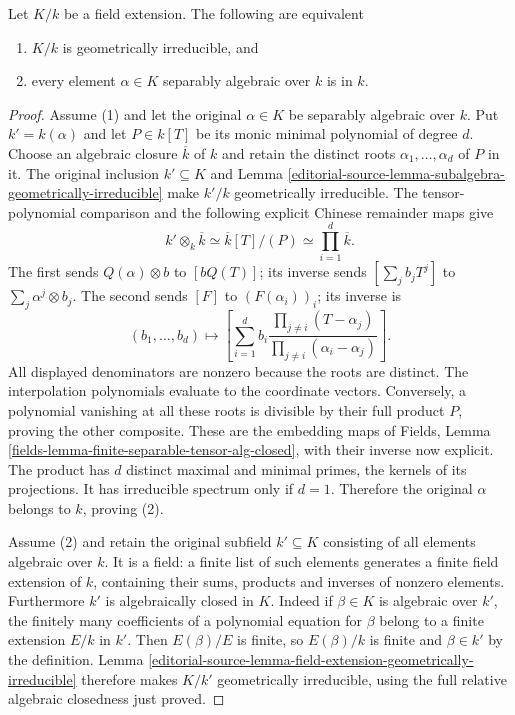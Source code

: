 \begin{lemma}
\label{editorial-source-lemma-geometrically-irreducible-separable-elements}
Let $K/k$ be a field extension. The following are equivalent
\begin{enumerate}
\item $K/k$ is geometrically irreducible, and
\item every element $\alpha \in K$ separably algebraic over $k$ is
in $k$.
\end{enumerate}
\end{lemma}

\begin{proof}
Assume (1) and let the original
$\alpha\in K$ be separably algebraic
over $k$. Put $k'=k(\alpha)$ and
let $P\in k[T]$ be its monic
minimal polynomial of degree $d$.
Choose an algebraic closure
$\overline k$ of $k$ and retain
the distinct roots
$\alpha_1,\ldots,\alpha_d$ of $P$
in it. The original inclusion
$k'\subseteq K$ and Lemma
\ref{editorial-source-lemma-subalgebra-geometrically-irreducible}
make $k'/k$ geometrically irreducible.
The tensor-polynomial comparison
and the following explicit Chinese
remainder maps give
$$
k'\otimes_k\overline k\simeq
\overline k[T]/(P)\simeq\prod_{i=1}^d\overline k.
$$
The first sends $Q(\alpha)\otimes b$
to $[bQ(T)]$; its inverse sends
$[\sum_j b_jT^j]$ to
$\sum_j\alpha^j\otimes b_j$.
The second sends $[F]$ to
$(F(\alpha_i))_i$; its inverse is
$$
(b_1,\ldots,b_d)\longmapsto
\left[\sum_{i=1}^d b_i
\frac{\prod_{j\ne i}(T-\alpha_j)}
{\prod_{j\ne i}(\alpha_i-\alpha_j)}\right].
$$
All displayed denominators are
nonzero because the roots are
distinct. The interpolation
polynomials evaluate to the
coordinate vectors. Conversely,
a polynomial vanishing at all
these roots is divisible by
their full product $P$, proving
the other composite. These are
the embedding maps of Fields,
Lemma
\ref{fields-lemma-finite-separable-tensor-alg-closed},
with their inverse now explicit.
The product has $d$ distinct
maximal and minimal primes,
the kernels of its projections.
It has irreducible spectrum
only if $d=1$. Therefore the
original $\alpha$ belongs to $k$,
proving (2).

Assume (2) and retain the original
subfield $k'\subseteq K$ consisting
of all elements algebraic over $k$.
It is a field: a finite list of
such elements generates a finite
field extension of $k$, containing
their sums, products and inverses
of nonzero elements. Furthermore
$k'$ is algebraically closed in
$K$. Indeed if $\beta\in K$ is
algebraic over $k'$, the finitely
many coefficients of a polynomial
equation for $\beta$ belong to a
finite extension $E/k$ in $k'$.
Then $E(\beta)/E$ is finite, so
$E(\beta)/k$ is finite and
$\beta\in k'$ by the definition.
Lemma
\ref{editorial-source-lemma-field-extension-geometrically-irreducible}
therefore makes $K/k'$ geometrically
irreducible, using the full relative
algebraic closedness just proved.


\end{proof}
